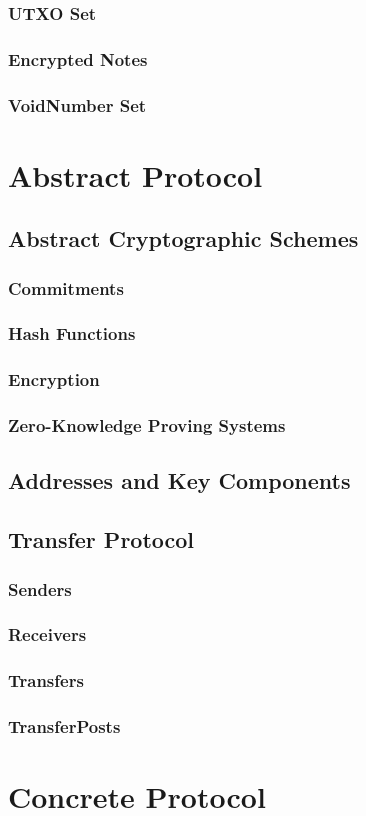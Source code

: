 \documentclass[a4paper]{article}
\newcommand{\lsection}[2]{\def\sectionlabel{#2} \section{#1}\label{sec:#2}}
\newcommand{\lsubsection}[2]{\def\sectionlabel{#2} \subsection{#1}\label{sec:#2}}
\newcommand{\lsubsubsection}[2]{\def\sectionlabel{#2} \subsubsection{#1}\label{sec:#2}}
\newcommand{\Receiver}{{\textsf{Receiver}}}
\newcommand{\Sender}{{\textsf{Sender}}}
\newcommand{\TransferPost}{{\textsf{TransferPost}}}
\newcommand{\Transfer}{{\textsf{Transfer}}}
\newcommand{\UTXO}{{\textsf{UTXO}}}
\newcommand{\VoidNumber}{{\textsf{VoidNumber}}}
\begin{document}
\lsubsubsection{\UTXO{} Set}{ledger-utxo-set}

\lsubsubsection{Encrypted Notes}{ledger-encrypted-notes}

\lsubsubsection{\VoidNumber{} Set}{ledger-void-number-set}

\lsection{Abstract Protocol}{abstract-protocol}

\subsection{Abstract Cryptographic Schemes}

\subsubsection{Commitments}

\subsubsection{Hash Functions}

\lsubsubsection{Encryption}{abstract-encryption}

\subsubsection{Zero-Knowledge Proving Systems}

\lsubsection{Addresses and Key Components}{addresses-and-key-components}

\lsubsection{\Transfer{} Protocol}{transfer-protocol}

\subsubsection{\Sender{s}}

\subsubsection{\Receiver{s}}

\subsubsection{\Transfer{s}}

\subsubsection{\TransferPost{s}}

\lsection{Concrete Protocol}{concrete-protocol}
\end{document}

